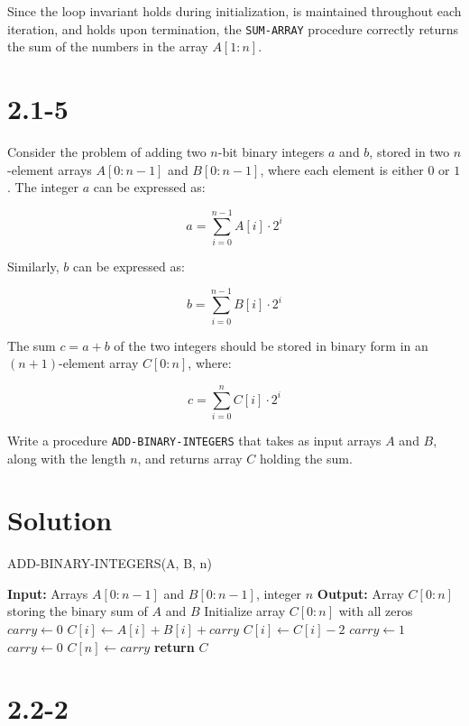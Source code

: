 \documentclass{article}
\begin{document}
Since the loop invariant holds during initialization, is maintained throughout each iteration, and holds upon termination, the \texttt{SUM-ARRAY} procedure correctly returns the sum of the numbers in the array $A[1:n]$.

\section*{2.1-5}

\text Consider the problem of adding two $n$-bit binary integers $a$ and $b$, stored in two $n$-element arrays $A[0 : n-1]$ and $B[0 : n-1]$, where each element is either $0$ or $1$. The integer $a$ can be expressed as:

\[
a = \sum_{i=0}^{n-1} A[i] \cdot 2^i
\]

Similarly, $b$ can be expressed as:

\[
b = \sum_{i=0}^{n-1} B[i] \cdot 2^i
\]

The sum $c = a + b$ of the two integers should be stored in binary form in an $(n+1)$-element array $C[0 : n]$, where:

\[
c = \sum_{i=0}^{n} C[i] \cdot 2^i
\]

Write a procedure \texttt{ADD-BINARY-INTEGERS} that takes as input arrays $A$ and $B$, along with the length $n$, and returns array $C$ holding the sum.

\section*{Solution}

\begin{algorithm}
\caption{ADD-BINARY-INTEGERS(A, B, n)}
\begin{algorithmic}[1]
\State \textbf{Input:} Arrays $A[0:n-1]$ and $B[0:n-1]$, integer $n$
\State \textbf{Output:} Array $C[0:n]$ storing the binary sum of $A$ and $B$
\State Initialize array $C[0:n]$ with all zeros
\State $carry \gets 0$
    \State $C[i] \gets A[i] + B[i] + carry$
        \State $C[i] \gets C[i] - 2$
        \State $carry \gets 1$
    \Else
        \State $carry \gets 0$
    \EndIf
\EndFor
\State $C[n] \gets carry$
\State \textbf{return} $C$
\end{algorithmic}
\end{algorithm}

\section*{2.2-2}
\end{document}
